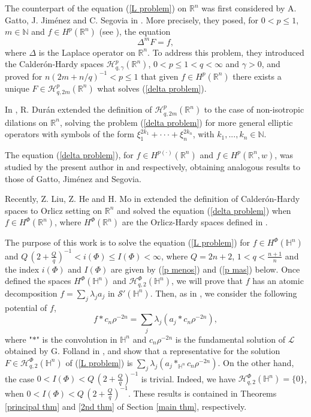 \documentclass[oneside,10pt]{article}
\begin{document}
The counterpart of the equation (\ref{L problem}) on $\mathbb{R}^n$ was first considered by A. Gatto, J. Jim\'enez and C. Segovia in \cite{segovia}. More precisely, they posed, for $0< p \leq 1$, $m \in \mathbb{N}$ and $f \in H^p(\mathbb{R}^n)$ (see \cite{fefferman}), the equation
\begin{equation} \label{delta problem}
\Delta^m F = f,
\end{equation}
where $\Delta$ is the Laplace operator on $\mathbb{R}^n$. To address this problem, they introduced the Calder\'on-Hardy spaces
$\mathcal{H}^p_{q, \gamma}(\mathbb{R}^n)$, $0 < p \leq 1 < q < \infty$ and $\gamma > 0$, and proved for $n(2m + n/q)^{-1} < p \leq 1$
that given $f \in H^p(\mathbb{R}^n)$ there exists a unique $F \in \mathcal{H}^p_{q, 2m}(\mathbb{R}^n)$ what solves (\ref{delta problem}).

In \cite{Duran}, R. Dur\'an extended the definition of $\mathcal{H}^p_{q, 2m}(\mathbb{R}^n)$ to the case of non-isotropic dilations on 
$\mathbb{R}^n$, solving the problem (\ref{delta problem}) for more general elliptic operators with symbols of the form 
$\xi_1^{2k_1} + \cdot \cdot \cdot + \xi_n^{2k_n}$, with $k_1, ..., k_n \in \mathbb{N}$.

The equation (\ref{delta problem}), for $f \in H^{p(\cdot)}(\mathbb{R}^{n})$ and $f \in H^{p}(\mathbb{R}^{n}, w)$, was studied by the present author in \cite{rocha1} and \cite{rocha2} respectively, obtaining analogous results to those of Gatto, Jim\'enez and Segovia.

Recently, Z. Liu, Z. He and H. Mo in \cite{He} extended the definition of Calder\'on-Hardy spaces to Orlicz setting on $\mathbb{R}^n$ and  solved the equation (\ref{delta problem}) when $f \in H^{\Phi}(\mathbb{R}^{n})$, where $H^{\Phi}(\mathbb{R}^{n})$ are the Orlicz-Hardy spaces defined in \cite{Nakai}.

The purpose of this work is to solve the equation (\ref{L problem}) for $f \in H^{\Phi}(\mathbb{H}^n)$ and $Q \, (2 + \frac{Q}{q})^{-1} < 
i(\Phi) \leq I(\Phi) < \infty$, where $Q= 2n+2$, $1 < q < \frac{n+1}{n}$ and the index $i(\Phi)$ and $I(\Phi)$ are given by (\ref{p menos}) and (\ref{p mas}) below. Once defined the spaces $H^{\Phi}(\mathbb{H}^n)$ and $\mathcal{H}^{\Phi}_{q, 2}(\mathbb{H}^{n})$, we will prove 
that $f$ has an atomic decomposition $f = \sum_j \lambda_j a_j$ in $\mathcal{S}'(\mathbb{H}^n)$. Then, as in \cite{rocha3}, we consider the following potential of $f$,
\[ 
f \ast c_n \rho^{-2n} = \sum_j \lambda_j (a_j \ast c_n \rho^{-2n}),
\]
where "$\ast$" is the convolution in $\mathbb{H}^n$ and $c_n \rho^{-2n}$ is the fundamental solution of $\mathcal{L}$ obtained by G. Folland in \cite{Folland}, and show that a representative for the solution $F \in \mathcal{H}^{\Phi}_{q, 2}(\mathbb{H}^{n})$ of (\ref{L problem}) is 
$\sum_j \lambda_j (a_j \ast_{\mathbb{H}^n} c_n \rho^{-2n})$. On the other hand, the case $0 < I(\Phi) < Q \, (2 + \frac{Q}{q})^{-1}$ 
is trivial. Indeed, we have $\mathcal{H}^{\Phi}_{q, 2}(\mathbb{H}^{n}) = \{ 0\}$, when $0 < I(\Phi) < Q \, (2 + \frac{Q}{q})^{-1}$. 
These results is contained in Theorems \ref{principal thm} and \ref{2nd thm} of Section \ref{main thm}, respectively. 
\end{document}

